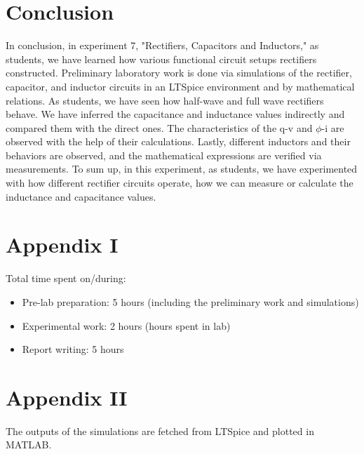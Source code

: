 \documentclass[letterpaper,12pt]{article}
\begin{document}
\section{Conclusion}

In conclusion, in experiment 7, "Rectifiers, Capacitors and Inductors," as students, we have learned how various functional circuit setups rectifiers constructed. Preliminary laboratory work is done via simulations of the rectifier, capacitor, and inductor circuits in an LTSpice environment and by mathematical relations. As students, we have seen how half-wave and full wave rectifiers behave. We have inferred the capacitance and inductance values indirectly and compared them with the direct ones. The characteristics of the q-v and \(\phi\)-i are observed with the help of their calculations. Lastly, different inductors and their behaviors are observed, and the mathematical expressions are verified via measurements. To sum up, in this experiment, as students, we have experimented with how different rectifier circuits operate, how we can measure or calculate the inductance and capacitance values. 
\section*{Appendix I}
Total time spent on/during:
\begin{itemize}
	\item Pre-lab preparation: 5 hours (including the preliminary work and simulations) 
	\item Experimental work: 2 hours (hours spent in lab)
	\item Report writing: 5 hours 
\end{itemize}
\section*{Appendix II}
The outputs of the simulations are fetched from LTSpice and plotted in MATLAB. 



\end{document}
